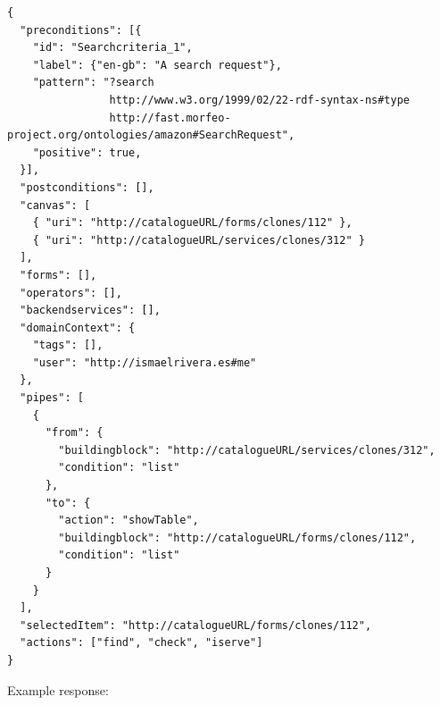 \documentclass{fast_latex}
\begin{document}
\singlespacing
\begin{verbatim}
{
  "preconditions": [{
    "id": "Searchcriteria_1",
    "label": {"en-gb": "A search request"},
    "pattern": "?search
                http://www.w3.org/1999/02/22-rdf-syntax-ns#type
                http://fast.morfeo-project.org/ontologies/amazon#SearchRequest",
    "positive": true,
  }],
  "postconditions": [],
  "canvas": [
    { "uri": "http://catalogueURL/forms/clones/112" },
    { "uri": "http://catalogueURL/services/clones/312" }
  ],
  "forms": [],
  "operators": [],
  "backendservices": [],
  "domainContext": {
    "tags": [],
    "user": "http://ismaelrivera.es#me"
  },
  "pipes": [
    {
      "from": {
        "buildingblock": "http://catalogueURL/services/clones/312",
        "condition": "list"
      },
      "to": {
        "action": "showTable",
        "buildingblock": "http://catalogueURL/forms/clones/112",
        "condition": "list"
      }
    }
  ],
  "selectedItem": "http://catalogueURL/forms/clones/112",
  "actions": ["find", "check", "iserve"]
}
\end{verbatim}
\doublespacing

Example response:
\end{document}
